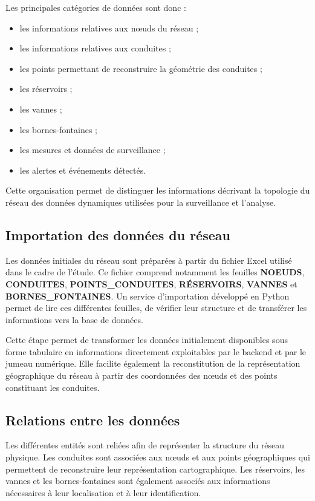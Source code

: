 Les principales catégories de données sont donc :

\begin{itemize}
	\item les informations relatives aux nœuds du réseau ;
	\item les informations relatives aux conduites ;
	\item les points permettant de reconstruire la géométrie des conduites ;
	\item les réservoirs ;
	\item les vannes ;
	\item les bornes-fontaines ;
	\item les mesures et données de surveillance ;
	\item les alertes et événements détectés.
\end{itemize}

Cette organisation permet de distinguer les informations décrivant la
topologie du réseau des données dynamiques utilisées pour la
surveillance et l'analyse.

\subsection{Importation des données du réseau}

Les données initiales du réseau sont préparées à partir du fichier
Excel utilisé dans le cadre de l'étude. Ce fichier comprend notamment
les feuilles \textbf{NOEUDS}, \textbf{CONDUITES},
\textbf{POINTS\_CONDUITES}, \textbf{RÉSERVOIRS}, \textbf{VANNES} et
\textbf{BORNES\_FONTAINES}. Un service d'importation développé en Python
permet de lire ces différentes feuilles, de vérifier leur structure et
de transférer les informations vers la base de données.

Cette étape permet de transformer les données initialement disponibles
sous forme tabulaire en informations directement exploitables par le
backend et par le jumeau numérique. Elle facilite également la
reconstitution de la représentation géographique du réseau à partir
des coordonnées des nœuds et des points constituant les conduites.

\subsection{Relations entre les données}

Les différentes entités sont reliées afin de représenter la structure
du réseau physique. Les conduites sont associées aux nœuds et aux
points géographiques qui permettent de reconstruire leur représentation
cartographique. Les réservoirs, les vannes et les bornes-fontaines sont
également associés aux informations nécessaires à leur localisation et
à leur identification.

